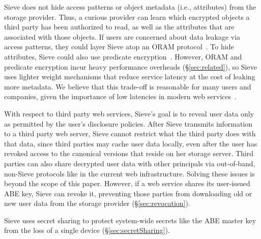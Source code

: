 Sieve does not hide access patterns
or object metadata (i.e., attributes) from
the storage provider. Thus, a curious
provider can learn which encrypted
objects a third party has been authorized
to read, as well as the attributes
that are associated with those objects.
If users are concerned about data
leakage via access patterns, they
could layer Sieve atop an ORAM
protocol~\cite{shroud}. To hide attributes,
Sieve could also use predicate encryption~\cite{katz2008,shen2009}.
However, ORAM and predicate encryption
incur heavy performance overheads
(\S\ref{sec:related}), so Sieve uses
lighter weight mechanisms that reduce
service latency at the cost of leaking
more metadata. We believe that this
trade-off is reasonable for many users
and companies, given the importance
of low latencies in modern web services~\cite{wprof,bobtail}.

With respect to third party web services,
Sieve's goal is to reveal user data only
as permitted by the user's disclosure
policies. After Sieve transmits information
to a third party web server, Sieve cannot
restrict what the third party does with that
data, since third parties may cache user data
locally, even after the user has revoked access
to the canonical versions that reside on her
storage server. Third parties can also share 
decrypted user data with other
principals via out-of-band, non-Sieve protocols
like in the current web infrastructure.
Solving these issues is beyond the scope of
this paper. However, if a web service shares its user-issued
ABE key, Sieve can revoke it, preventing
those parties from downloading old or new
user data from the storage provider
(\S\ref{sec:revocation}).

Sieve uses secret sharing to
protect system-wide secrets like the ABE
master key from the loss of a single device
(\S\ref{sec:secretSharing}).
